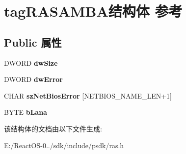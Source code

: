 \hypertarget{structtag_r_a_s_a_m_b_a}{}\section{tag\+R\+A\+S\+A\+M\+B\+A结构体 参考}
\label{structtag_r_a_s_a_m_b_a}
\subsection*{Public 属性}
\begin{DoxyCompactItemize}
\item 
\mbox{\label{structtag_r_a_s_a_m_b_a_a5a2dfb4fa31864e0ebe3267a68fcec0c}} 
D\+W\+O\+RD {\bfseries dw\+Size}
\item 
\mbox{\label{structtag_r_a_s_a_m_b_a_a273fcb4a7ccc1b15138a92b9b8313f43}} 
D\+W\+O\+RD {\bfseries dw\+Error}
\item 
\mbox{\label{structtag_r_a_s_a_m_b_a_a7ec06ca80d17fdc386c8e7027e4e6d0c}} 
C\+H\+AR {\bfseries sz\+Net\+Bios\+Error} \mbox{[}N\+E\+T\+B\+I\+O\+S\+\_\+\+N\+A\+M\+E\+\_\+\+L\+EN+1\mbox{]}
\item 
\mbox{\label{structtag_r_a_s_a_m_b_a_ab4f4a28096831d96d94e8c0d19df75a7}} 
B\+Y\+TE {\bfseries b\+Lana}
\end{DoxyCompactItemize}


该结构体的文档由以下文件生成\+:\begin{DoxyCompactItemize}
\item 
E\+:/\+React\+O\+S-\/0../sdk/include/psdk/ras.\+h\end{DoxyCompactItemize}
